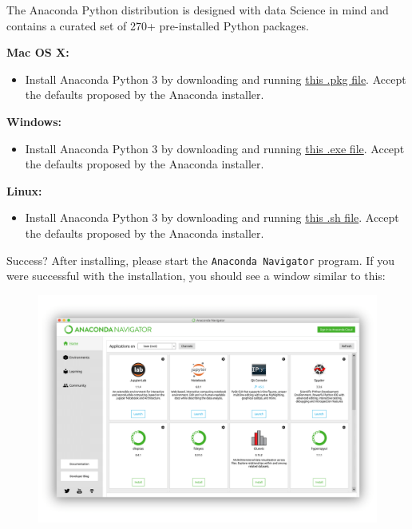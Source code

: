 \documentclass[]{book}
\providecommand{\tightlist}{%
  \setlength{\itemsep}{0pt}\setlength{\parskip}{0pt}}
\begin{document}
The Anaconda Python distribution is designed with data Science in mind
and contains a curated set of 270+ pre-installed Python packages.

\textbf{Mac OS X:}

\begin{itemize}
\tightlist
\item
  Install Anaconda Python 3 by downloading and running
  \href{https://repo.anaconda.com/archive/Anaconda3-2019.10-MacOSX-x86_64.pkg}{this
  .pkg file}. Accept the defaults proposed by the Anaconda installer.
\end{itemize}

\textbf{Windows:}

\begin{itemize}
\tightlist
\item
  Install Anaconda Python 3 by downloading and running
  \href{https://repo.anaconda.com/archive/Anaconda3-2019.10-Windows-x86_64.exe}{this
  .exe file}. Accept the defaults proposed by the Anaconda installer.
\end{itemize}

\textbf{Linux:}

\begin{itemize}
\tightlist
\item
  Install Anaconda Python 3 by downloading and running
  \href{https://repo.anaconda.com/archive/Anaconda3-2019.10-Linux-x86_64.sh}{this
  .sh file}. Accept the defaults proposed by the Anaconda installer.
\end{itemize}

Success? After installing, please start the \texttt{Anaconda\ Navigator}
program. If you were successful with the installation, you should see a
window similar to this:

\begin{figure}
\centering
\includegraphics{Python/PythonInstall/images/Anaconda_navigator.png}
\caption{}
\end{figure}
\end{document}
